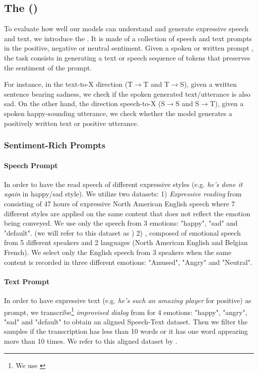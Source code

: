 \subsection{The \sentimentbenchmark (\sentimentbenchmarkSHORT)}
\label{sec:stspbenchmark}
To evaluate how well our \spot models can understand and generate expressive speech and text, we introduce the \sentimentbenchmark{}. It is made of a collection of speech and text prompts in the positive, negative or neutral sentiment. Given a spoken or written prompt , the task consists in generating a text or speech sequence of tokens that preserves the sentiment of the prompt. 

For instance, in the text-to-X direction (T$\rightarrow$T and T$\rightarrow$S), given a written sentence bearing sadness, we check if the spoken generated text/utterance is also sad. On the other hand, the direction speech-to-X (S$\rightarrow$S and S$\rightarrow$T), given a spoken happy-sounding utterance, we check whether the model generates a positively written text or positive utterance.

\subsubsection{Sentiment-Rich %
Prompts} \label{sec:sentimentcontinuation:data}
\paragraph{Speech Prompt} In order to have the read speech of different expressive styles (e.g. \textit{he's done it again} in happy/sad style). We utilize two datasets: 1) \textit{Expressive reading} from \expresso \cite{nguyen2023expresso} consisting of 47 hours of expressive North American English speech where 7 different styles are applied on the same content that does not reflect the emotion being conveyed. We use only the speech from 3 emotions: "happy", "sad" and "default". (we will refer to this dataset as \expressoread) 2) \emov\cite{adigwe2018emov}, composed of emotional speech from 5 different speakers and 2 languages (North American English and Belgian French). We select only the English speech from 3 speakers when the same content is recorded in three different emotions: "Amused", "Angry" and "Neutral".

\paragraph{Text Prompt} In order to have expressive text (e.g. \textit{he's such an amazing player} for positive) as prompt, we transcribe\footnote{We use \whispermedium\cite{radford2023robust}} \textit{improvised dialog} from \expresso for 4 emotions: "happy", "angry", "sad" and "default" to obtain an aligned Speech-Text dataset. Then we filter the samples if the transcription has less than 10 words %
or it has one word appearing more than 10 times. We refer to this aligned dataset by \expressoasr.

